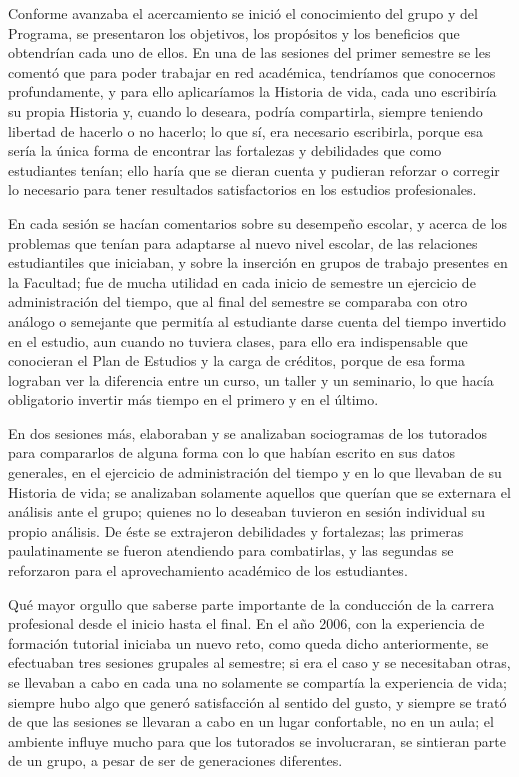 Conforme avanzaba el acercamiento se inició el conocimiento del grupo y del
Programa, se presentaron los objetivos, los propósitos y los beneficios que
obtendrían cada uno de ellos. En una de las sesiones del primer semestre se
les comentó que para poder trabajar en red académica, tendríamos que
conocernos profundamente, y para ello aplicaríamos la Historia de vida,
cada uno escribiría su propia Historia y, cuando lo deseara, podría
compartirla, siempre teniendo libertad de hacerlo o no hacerlo; lo que sí,
era necesario escribirla, porque esa sería la única forma de encontrar las
fortalezas y debilidades que como estudiantes tenían; ello haría que se
dieran cuenta y pudieran reforzar o corregir lo necesario para tener
resultados satisfactorios en los estudios profesionales.


En cada sesión se hacían comentarios sobre su desempeño
escolar, y acerca de los problemas que tenían para adaptarse al nuevo nivel escolar,
de las relaciones estudiantiles que iniciaban, y sobre la inserción en grupos de
trabajo presentes en la Facultad; fue de mucha utilidad en cada inicio de
semestre un ejercicio de administración del tiempo, que al final del
semestre se comparaba con otro análogo o semejante que permitía al
estudiante darse cuenta del tiempo invertido en el estudio, aun cuando no
tuviera clases, para ello era indispensable que conocieran el Plan de
Estudios y la carga de créditos, porque de esa forma lograban ver la
diferencia entre un curso, un taller y un seminario, lo que hacía
obligatorio invertir más tiempo en el primero y en el último.


En dos sesiones más, elaboraban y se analizaban sociogramas de los tutorados
para compararlos de alguna forma con lo que habían escrito en sus datos
generales, en el ejercicio de administración del tiempo y en lo que
llevaban de su Historia de vida; se analizaban solamente aquellos que
querían que se externara el análisis ante el grupo; quienes no lo deseaban
tuvieron en sesión individual su propio análisis. De éste se extrajeron
debilidades y fortalezas; las primeras paulatinamente se fueron atendiendo
para combatirlas, y las segundas se reforzaron para el aprovechamiento
académico de los estudiantes.  


Qué mayor orgullo que saberse parte importante de la conducción de la
carrera profesional desde el inicio hasta el final. En el año 2006, con la
experiencia de formación tutorial iniciaba un nuevo reto, como queda dicho
anteriormente, se efectuaban tres sesiones grupales al semestre; si era el
caso y se necesitaban otras, se llevaban a cabo en cada una no solamente se
compartía la experiencia de vida; siempre hubo algo que generó satisfacción
al sentido del gusto, y siempre se trató de que las sesiones se llevaran a
cabo en un lugar confortable, no en un aula; el ambiente influye mucho para
que los tutorados se involucraran, se sintieran parte de un grupo, a pesar
de ser de generaciones diferentes.


